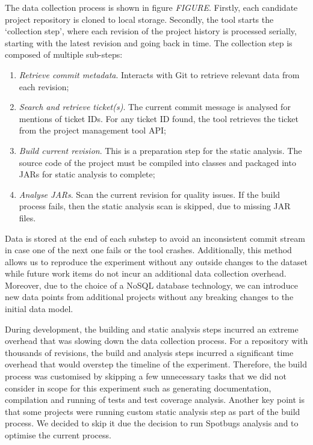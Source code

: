 \documentclass{mpaper}
\begin{document}
The data collection process is shown in figure \emph{FIGURE}. Firstly, each
candidate project repository is cloned to local storage. Secondly, the tool
starts the `collection step', where each revision of the project history is
processed serially, starting with the latest revision and going back in time.
The collection step is composed of multiple sub-steps:
\begin{enumerate}
  \item \emph{Retrieve commit metadata}. Interacts with Git to retrieve relevant
  data from each revision;
  \item \emph{Search and retrieve ticket(s)}. The current commit message is
  analysed for mentions of ticket IDs. For any ticket ID found, the tool
  retrieves the ticket from the project management tool API;
  \item \emph{Build current revision}. This is a preparation step for the static
  analysis. The source code of the project must be compiled into classes and
  packaged into JARs for static analysis to complete;
  \item \emph{Analyse JARs}. Scan the current revision for quality issues. If
  the build process fails, then the static analysis scan is skipped, due to
  missing JAR files. 
\end{enumerate}

Data is stored at the end of each substep to avoid an inconsistent commit stream
in case one of the next one fails or the tool crashes. Additionally, this method
allows us to reproduce the experiment without any outside changes to the dataset
while future work items do not incur an additional data collection overhead.
Moreover, due to the choice of a NoSQL database technology, we can introduce new
data points from additional projects without any breaking changes to the initial
data model. 

During development, the building and static analysis steps incurred an extreme
overhead that was slowing down the data collection process. For a repository
with thousands of revisions, the build and analysis steps incurred a significant
time overhead that would overstep the timeline of the experiment. Therefore, the
build process was customised by skipping a few unnecessary tasks that we did not
consider in scope for this experiment such as generating documentation,
compilation and running of tests and test coverage analysis. Another key point
is that some projects were running custom static analysis step as part of the
build process. We decided to skip it due the decision to run Spotbugs analysis
and to optimise the current process. 
\end{document}
